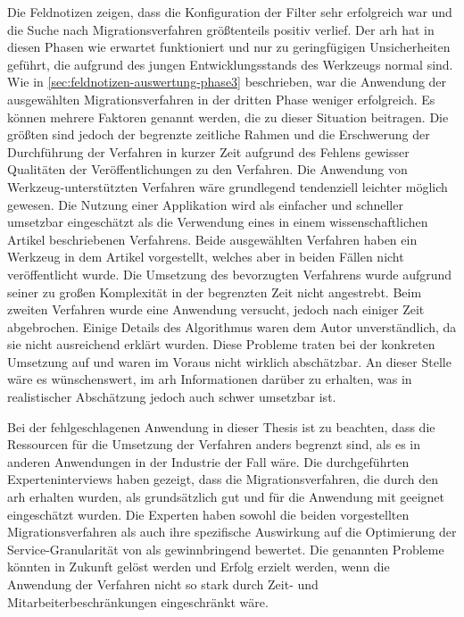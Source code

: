 Die Feldnotizen zeigen, dass die Konfiguration der Filter sehr erfolgreich war und die Suche nach Migrationsverfahren größtenteils positiv verlief.
Der \gls{arh} hat in diesen Phasen wie erwartet funktioniert und nur zu geringfügigen Unsicherheiten geführt, die aufgrund des jungen Entwicklungsstands des Werkzeugs normal sind.
Wie in \cref{sec:feldnotizen-auswertung-phase3} beschrieben, war die Anwendung der ausgewählten Migrationsverfahren in der dritten Phase weniger erfolgreich.
Es können mehrere Faktoren genannt werden, die zu dieser Situation beitragen. 
Die größten sind jedoch der begrenzte zeitliche Rahmen und die Erschwerung der Durchführung der Verfahren in kurzer Zeit aufgrund des Fehlens gewisser Qualitäten der Veröffentlichungen zu den Verfahren.
Die Anwendung von Werkzeug-unterstützten Verfahren wäre grundlegend tendenziell leichter möglich gewesen. 
Die Nutzung einer Applikation wird als einfacher und schneller umsetzbar eingeschätzt als die Verwendung eines in einem wissenschaftlichen Artikel beschriebenen Verfahrens.
Beide ausgewählten Verfahren haben ein Werkzeug in dem Artikel vorgestellt, welches aber in beiden Fällen nicht veröffentlicht wurde.
Die Umsetzung des bevorzugten Verfahrens wurde aufgrund seiner zu großen Komplexität in der begrenzten Zeit nicht angestrebt.
Beim zweiten Verfahren wurde eine Anwendung versucht, jedoch nach einiger Zeit abgebrochen.
Einige Details des Algorithmus waren dem Autor unverständlich, da sie nicht ausreichend erklärt wurden. 
Diese Probleme traten bei der konkreten Umsetzung auf und waren im Voraus nicht wirklich abschätzbar.
An dieser Stelle wäre es wünschenswert, im \gls{arh} Informationen darüber zu erhalten, was in realistischer Abschätzung jedoch auch schwer umsetzbar ist.

Bei der fehlgeschlagenen Anwendung in dieser Thesis ist zu beachten, dass die Ressourcen für die Umsetzung der Verfahren anders begrenzt sind, als es in anderen Anwendungen in der Industrie der Fall wäre.
Die durchgeführten Experteninterviews haben gezeigt, dass die Migrationsverfahren, die durch den \gls{arh} erhalten wurden, als grundsätzlich gut und für die Anwendung mit \jf geeignet eingeschätzt wurden.
Die Experten haben sowohl die beiden vorgestellten Migrationsverfahren als auch ihre spezifische Auswirkung auf die Optimierung der Service-Granularität von \jf als gewinnbringend bewertet. 
Die genannten Probleme könnten in Zukunft gelöst werden und Erfolg erzielt werden, wenn die Anwendung der Verfahren nicht so stark durch Zeit- und Mitarbeiterbeschränkungen eingeschränkt wäre.

